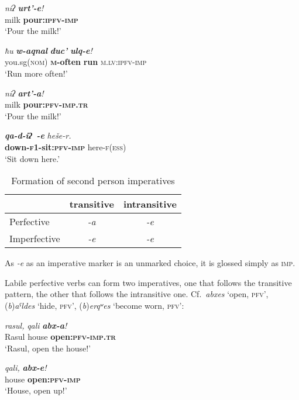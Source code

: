 ﻿\documentclass[output=paper]{langsci/langscibook}
\begin{document}
\ea \label{ex:5:1} %
\gll \emph{niʔ}  \emph{\textbf{urt'-e}!}\\
milk  \textbf{pour:\textsc{ipfv}-\textsc{imp}}\\
\glt `Pour the milk!'
\pagebreak

\ex \label{ex:5:2} %
\gll \emph{ħu} \emph{\textbf{w-aqnal}} \emph{\textbf{duc'}} \emph{\textbf{ulq-e}!}\\
 you.sg(\textsc{nom})  \textbf{\textsc{m}-often}  \textbf{run}  \textsc{m}.\textsc{lv}:\textsc{ipfv}-\textsc{imp}\\
\glt `Run more often!'

\ex %
\gll \emph{niʔ}  \emph{\textbf{art'-a}!}\\
 milk  \textbf{pour:\textsc{pfv}-\textsc{imp}.\textsc{tr}}\\
\glt `Pour the milk!'

\ex %
\gll \emph{\textbf{qa-d-iʔ~-e}}  \emph{heše-r.}\\
\textbf{down-\textsc{f1}-sit:\textsc{pfv}-\textsc{imp}}  here-\textsc{f}(\textsc{ess})\\
\glt `Sit down here.'
\z


\begin{table}
\caption{Formation of second person imperatives}\label{tab:5:1}
\begin{tabular}{@{}lcc@{}}
\toprule
& transitive & intransitive\tabularnewline  \midrule
Perfective & \emph{-a} & \emph{-e} \tabularnewline
Imperfective & \emph{-e} & \emph{-e} \tabularnewline
\bottomrule
\end{tabular}

\end{table}

As \emph{-e} as an imperative marker is an unmarked choice, it is
glossed simply as \textsc{imp}.

Labile perfective verbs can form two imperatives, one that follows the
transitive pattern, the other that follows the intransitive one. Cf.\
\emph{abxes} `open, \textsc{pfv}', (\emph{b})\emph{aˤldes} `hide, \textsc{pfv}',
(\emph{b})\emph{erqʷes} `become worn, \textsc{pfv}':

\ea %
 \emph{rasul,} \emph{qali} \emph{\textbf{abx-a}!}\\
Rasul house \textbf{open:\textsc{pfv}-\textsc{imp}.\textsc{tr}}\\
\glt `Rasul, open the house!'

\ex %
\gll \emph{qali,} \emph{\textbf{abx-e}!}\\
house \textbf{open:\textsc{pfv}-\textsc{imp}}\\
\glt `House, open up!'
\end{document}
